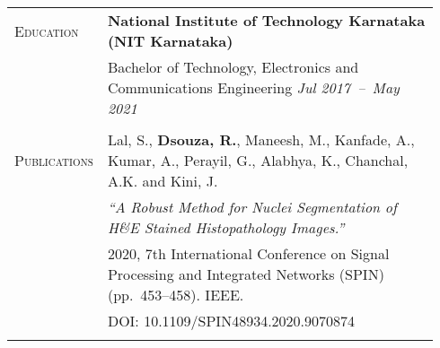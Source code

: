 \documentclass[letterpaper, 10pt, oneside]{article}
\newcommand{\stitle}[1]{\normalsize{\textsc{#1}}}
\begin{document}
\noindent \begin{longtable}{@{} p{0.14\linewidth} p{0.8\linewidth}}



\stitle{Education} & \textbf{National Institute of Technology Karnataka (NIT Karnataka)} \\
                   & Bachelor of Technology, Electronics and Communications Engineering \hfill \hspace{-3em} \textit{Jul 2017\ --\ May 2021} \\
\\


\stitle{Publications} & Lal, S., \textbf{Dsouza, R.}, Maneesh, M., Kanfade, A., Kumar, A., Perayil, G., Alabhya, K., Chanchal, A.K. and Kini, J. \\
                      & \textit{``A Robust Method for Nuclei Segmentation of H\&E Stained Histopathology Images.''} \\
                      & 2020, 7th International Conference on Signal Processing and Integrated Networks (SPIN) (pp.~453--458)\@. IEEE\@.  \\
                      & \textcolor{dark-purple}{DOI\@: 10.1109/SPIN48934.2020.9070874} \\
\\



\end{longtable}
\end{document}
